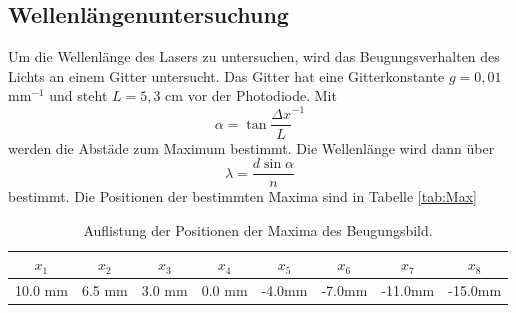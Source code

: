 \subsection{Wellenlängenuntersuchung}
Um die Wellenlänge des Lasers zu untersuchen, wird das Beugungsverhalten des Lichts an
einem Gitter untersucht. Das Gitter hat eine Gitterkonstante $g=0,01$mm$^{-1}$ und steht
$L=5,3$ cm vor der Photodiode. Mit
\begin{equation}
  \alpha = \tan{\frac{\Delta x}{L}}^{-1}
\end{equation}
werden die Abstäde zum Maximum bestimmt. Die Wellenlänge wird dann über
\begin{equation}
  \lambda=\frac{d\sin{\alpha}}{n}
\end{equation}
bestimmt.
Die Positionen der bestimmten Maxima sind in Tabelle \ref{tab:Max}
\begin{table}[H]
    \centering
    \caption{Auflistung der Positionen der Maxima des Beugungsbild.}
    \label{tab:Konfig}
    \begin{tabular}{c|c|c|c|c|c|c|c}
        \toprule
        $x_1$& $x_2$ & $x_3$ & $x_4$ & $x_5$ & $x_6$ & $x_7$ & $x_8$\\
        \midrule
        10.0 mm & 6.5 mm & 3.0 mm & 0.0 mm & -4.0mm & -7.0mm & -11.0mm & -15.0mm \\
        \bottomrule
    \end{tabular}
\end{table}
